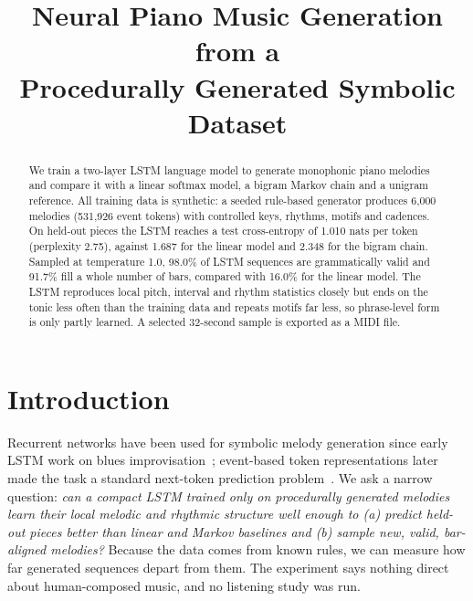 \documentclass[conference]{IEEEtran}
\begin{document}
\title{Neural Piano Music Generation from a\\Procedurally Generated Symbolic Dataset}

\author{
\and
{}
\and
{}
}

\maketitle

\begin{abstract}
We train a two-layer LSTM language model to generate monophonic piano melodies and compare it
with a linear softmax model, a bigram Markov chain and a unigram reference. All training data
is synthetic: a seeded rule-based generator produces 6{,}000 melodies (531{,}926 event tokens)
with controlled keys, rhythms, motifs and cadences. On held-out pieces the LSTM reaches a test
cross-entropy of 1.010 nats per token (perplexity 2.75), against 1.687 for the linear model and
2.348 for the bigram chain. Sampled at temperature 1.0, 98.0\% of LSTM sequences are
grammatically valid and 91.7\% fill a whole number of bars, compared with 16.0\% for the
linear model. The LSTM reproduces local pitch, interval and rhythm statistics closely but ends
on the tonic less often than the training data and repeats motifs far less, so phrase-level
form is only partly learned. A selected 32-second sample is exported as a MIDI file.
\end{abstract}

\section{Introduction}
Recurrent networks have been used for symbolic melody generation since early LSTM work on
blues improvisation~\cite{eck2002}; event-based token representations later made the task a
standard next-token prediction problem~\cite{oore2018,briot2020}. We ask a narrow question:
\emph{can a compact LSTM trained only on procedurally generated melodies learn their local
melodic and rhythmic structure well enough to (a) predict held-out pieces better than linear
and Markov baselines and (b) sample new, valid, bar-aligned melodies?} Because the data comes
from known rules, we can measure how far generated sequences depart from them. The experiment
says nothing direct about human-composed music, and no listening study was run.
\end{document}
